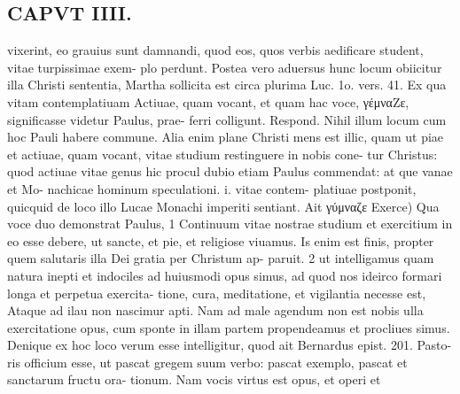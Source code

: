 \documentclass{article}
\begin{document}
\begin{pages}
\section*{CAPVT  IIII. }
\marginpar{[ p.205 ]}vixerint, eo grauius sunt damnandi, quod eos, quos verbis aedificare student, vitae turpissimae exem- plo perdunt. Postea vero aduersus hunc locum obiicitur illa Christi sententia, Martha sollicita est circa plurima Luc. 1o. vers. 41. Ex qua vitam contemplatiuam Actiuae, quam vocant, et quam hac voce, γέμναZε, significasse videtur Paulus, prae- ferri colligunt. Respond. Nihil illum locum cum hoc Pauli habere commune. Alia enim plane Christi mens est illic, quam ut piae et actiuae, quam vocant, vitae studium restinguere in nobis cone- tur Christus: quod actiuae vitae genus hic procul dubio etiam Paulus commendat: at que vanae et Mo- nachicae hominum speculationi. i. vitae contem- platiuae postponit, quicquid de loco illo Lucae Monachi imperiti sentiant. Ait γύμναζε Exerce) Qua voce duo demonstrat Paulus, 1 Continuum vitae nostrae studium et exercitium in eo esse debere, ut sancte, et pie, et religiose viuamus. Is enim est finis, propter quem salutaris illa Dei gratia per Christum ap- paruit. 2 ut intelligamus quam natura inepti et indociles ad huiusmodi opus simus, ad quod nos ideirco formari longa et perpetua exercita- tione, cura, meditatione, et vigilantia necesse est, Ataque ad ilau non nascimur apti. Nam ad male agendum non est nobis ulla exercitatione opus, cum sponte in illam partem propendeamus et procliues simus. Denique ex hoc loco verum esse intelligitur, quod ait Bernardus epist. 201. Pasto- ris officium esse, ut pascat gregem suum verbo: pascat exemplo, pascat et sanctarum fructu ora- tionum. Nam vocis virtus est opus, et operi et 

\end{pages}
\end{document}
